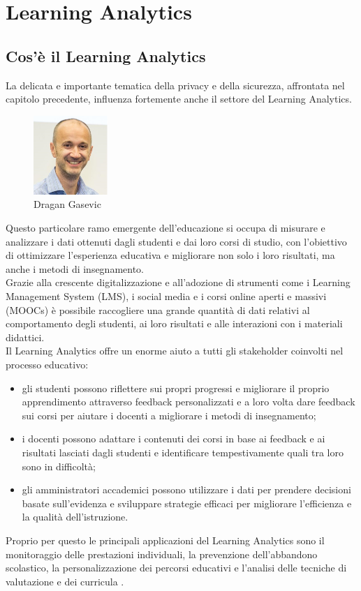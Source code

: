 \chapter{Learning Analytics}
\section{Cos'è il Learning Analytics}
La delicata e importante tematica della privacy e della sicurezza, affrontata nel capitolo precedente, influenza fortemente anche il settore
del Learning Analytics.
\begin{figure}
    \centering
    \includegraphics[width=0.25\textwidth]{Immagini/Dragan Gasevic.jpg}
    \caption{Dragan Gasevic}
\end{figure}
Questo particolare ramo emergente dell'educazione si occupa di misurare e analizzare i dati ottenuti dagli studenti e dai loro corsi
di studio, con l'obiettivo di ottimizzare l'esperienza educativa e migliorare non solo i loro risultati, ma anche i metodi di insegnamento. 
\\Grazie alla crescente digitalizzazione e all'adozione di strumenti 
come i Learning Management System (LMS), i social media e i corsi online aperti e massivi (MOOCs) è possibile raccogliere una grande quantità di dati relativi al comportamento degli studenti, 
ai loro risultati e alle interazioni con i materiali didattici. 
\\Il Learning Analytics offre un enorme aiuto a tutti gli stakeholder coinvolti nel processo educativo:
\begin{itemize}
    \item gli studenti possono riflettere sui propri progressi e migliorare il proprio apprendimento attraverso feedback personalizzati e a loro volta dare feedback sui corsi per aiutare i docenti a migliorare i metodi di insegnamento;
    \item i docenti possono adattare i contenuti dei corsi in base ai feedback e ai risultati lasciati dagli studenti e identificare tempestivamente quali tra loro sono in difficoltà;
    \item gli amministratori accademici possono utilizzare i dati per prendere decisioni basate sull'evidenza e sviluppare strategie efficaci per migliorare l'efficienza e la qualità dell'istruzione.
\end{itemize}
Proprio per questo le principali applicazioni del Learning Analytics sono il monitoraggio delle prestazioni individuali, la prevenzione dell'abbandono scolastico,
la personalizzazione dei percorsi educativi e l'analisi delle tecniche di valutazione e dei curricula \cite{wikipedia_learning_analytics}.

